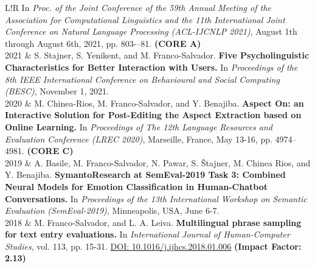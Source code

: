 \documentclass[10pt]{article}
\begin{document}
\begin{tabular}{L!{\VRule}R}
	In \emph{Proc. of the Joint Conference of the 59th Annual Meeting of the Association for Computational Linguistics and the 11th International Joint Conference on Natural Language Processing (ACL-IJCNLP 2021)}, August 1th through August 6th, 2021, pp.  803-–81. \textbf{(CORE A)}\vspace{5pt}\\
	2021 & S. Stajner, S. Yenikent, and M. Franco-Salvador. \textbf{Five Psycholinguistic Characteristics for Better Interaction with Users.}
	In \emph{Proceedings of the 8th IEEE International Conference on Behavioural and Social Computing (BESC)}, November 1, 2021.\vspace{5pt}\\
	2020 & M. Chinea-Rios, M. Franco-Salvador, and Y. Benajiba. \textbf{Aspect On: an Interactive Solution for Post-Editing the Aspect Extraction based on Online Learning.}
	In \emph{Proceedings of The 12th Language Resources and Evaluation Conference (LREC 2020)}, Marseille, France, May 13-16, pp. 4974--4981. 	\textbf{(CORE C)}\vspace{5pt}\\
    2019 & A. Basile, M. Franco-Salvador, N. Pawar, S. \v{S}tajner, M. Chinea Rios, and Y. Benajiba. \textbf{SymantoResearch at SemEval-2019 Task 3: Combined Neural Models for Emotion Classification in Human-Chatbot Conversations.}
	In \emph{Proceedings of the 13th International Workshop on Semantic Evaluation (SemEval-2019)}, Minneapolis, USA, June 6-7.\vspace{5pt}\\
    2018 & M. Franco-Salvador, and L. A. Leiva. \textbf{Multilingual phrase sampling for text entry evaluations.}
	In \emph{International Journal of Human-Computer Studies}, vol. 113, pp. 15-31. \href{https://doi.org/10.1016/j.ijhcs.2018.01.006}{DOI: 10.1016/j.ijhcs.2018.01.006} \textbf{(Impact Factor: 2.13)} \vspace{5pt}\\	
\end{tabular}
\end{document}
